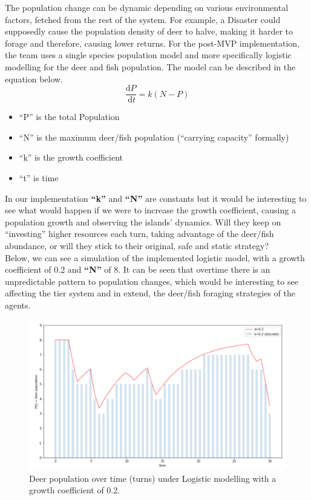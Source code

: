 The population change can be dynamic depending on various environmental factors, fetched from the rest of the system. For example, a Disaster could supposedly cause the population density of deer to halve, making it harder to forage and therefore, causing lower returns. For the post-MVP implementation, the team uses a single species population model and more specifically logistic modelling for the deer and fish population. The model can be described in the equation below. \\

\begin{equation}
\frac{\mathrm{d} P}{\mathrm{~d} t}=k(N-P)
\end{equation}

\begin{itemize}
        \item “P” is the total Population \item “N” is the maximum deer/fish population (“carrying capacity” formally)
        \item “k” is the growth coefficient
        \item “t” is time
    \end{itemize}

In our implementation \textbf{“k”} and \textbf{“N”} are constants but it would be interesting to see what would happen if we were to increase the growth coefficient, causing a population growth and observing the islands’ dynamics. Will they keep on “investing” higher resources each turn, taking advantage of the deer/fish abundance, or will they stick to their original, safe and static strategy?\\

Below, we can see a simulation of the implemented logistic model, with a growth coefficient of 0.2 and \textbf{“N”} of 8. It can be seen that overtime there is an unpredictable pattern to population changes, which would be interesting to see affecting the tier system and in extend, the deer/fish foraging strategies of the agents.\\

\begin{figure}[!htb]
    \centering
    \includegraphics[width=1\textwidth]{04_environment/Images/Deer population over time.PNG}
    \caption{Deer population over time (turns) under Logistic modelling with a growth coefficient of 0.2.}
    \label{Images:Deer population over time}
\end{figure}

